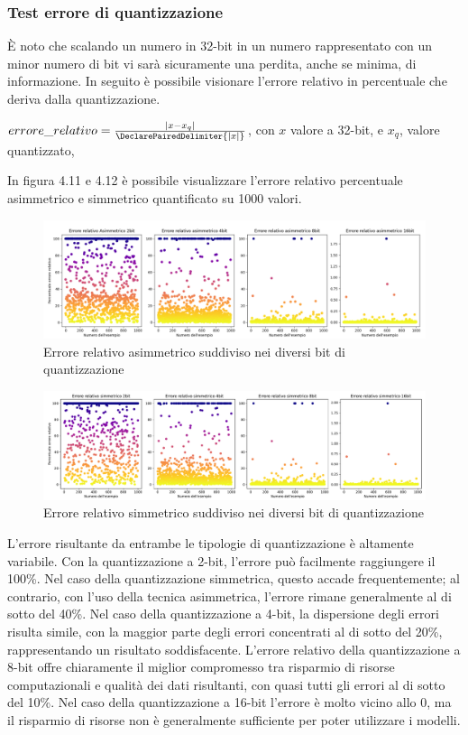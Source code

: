     \subsubsection{Test errore di quantizzazione}
     È noto che scalando un numero in 32-bit in un numero rappresentato con un minor numero di bit vi sarà sicuramente una perdita, anche se minima, di informazione. In seguito è possibile visionare l'errore relativo in percentuale che deriva dalla quantizzazione.\\
     \centerline{$errore\_relativo = \frac{|x - x_q|}{\DeclarePairedDelimiter{|x|}}$, con $x$ valore a 32-bit, e $x_q$, valore quantizzato,}
     In figura 4.11 e 4.12 è possibile visualizzare l'errore relativo percentuale asimmetrico e simmetrico quantificato su 1000 valori.
    \begin{figure}[!h]
        \centering        
        \includegraphics[width=14.5cm]{img/totA.pdf}
        \caption{Errore relativo asimmetrico suddiviso nei diversi bit di quantizzazione}
    \end{figure}\newline
    \begin{figure}[!h]
        \centering        
        \includegraphics[width=14.5cm]{img/totS.pdf}
        \caption{Errore relativo simmetrico suddiviso nei diversi bit di quantizzazione}
    \end{figure}    
    \newline
    L'errore risultante da entrambe le tipologie di quantizzazione è altamente variabile. Con la quantizzazione a 2-bit, l'errore può facilmente raggiungere il 100\%. Nel caso della quantizzazione simmetrica, questo accade frequentemente; al contrario, con l'uso della tecnica asimmetrica, l'errore rimane generalmente al di sotto del 40\%.
    Nel caso della quantizzazione a 4-bit, la dispersione degli errori risulta simile, con la maggior parte degli errori concentrati al di sotto del 20\%, rappresentando un risultato soddisfacente. L'errore relativo della quantizzazione a 8-bit offre chiaramente il miglior compromesso tra risparmio di risorse computazionali e qualità dei dati risultanti, con quasi tutti gli errori al di sotto del 10\%.
    Nel caso della quantizzazione a 16-bit l'errore è molto vicino allo 0, ma il risparmio di risorse non è generalmente sufficiente per poter utilizzare i modelli.

